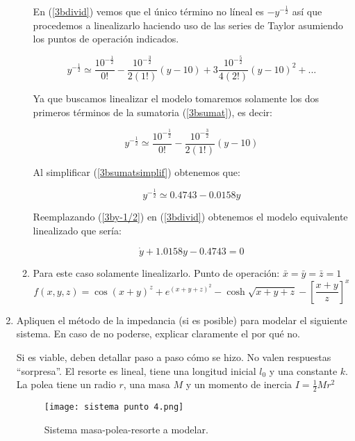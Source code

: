\documentclass[letterpaper, 12pt]{article}
\begin{document}
\begin{enumerate}
\begin{enumerate}
En (\ref{3bdivid}) vemos que el único término no líneal es $-y^{-\frac{1}{2}}$ así que procedemos a linealizarlo haciendo uso de las series de Taylor asumiendo los puntos de operación indicados.

\begin{equation}
    y^{-\frac{1}{2}}\simeq \frac{10^{-\frac{1}{2}}}{0!}-\frac{10^{-\frac{3}{2}}}{{2(1!)}}(y-10)+3\frac{10^{-\frac{5}{2}}}{{4(2!)}}(y-10)^2+...
    \label{3bsumat}
\end{equation}

Ya que buscamos linealizar el modelo tomaremos solamente los dos primeros términos de la sumatoria (\ref{3bsumat}), es decir:

\begin{equation}
    y^{-\frac{1}{2}}\simeq \frac{10^{-\frac{1}{2}}}{0!}-\frac{10^{-\frac{3}{2}}}{{2(1!)}}(y-10)
    \label{3bsumatsimplif}
\end{equation}

Al simplificar (\ref{3bsumatsimplif}) obtenemos que:

\begin{equation}
    y^{-\frac{1}{2}}\simeq 0.4743-0.0158y
    \label{3by-1/2}
\end{equation}

Reemplazando (\ref{3by-1/2}) en (\ref{3bdivid}) obtenemos el modelo equivalente linealizado que sería:


\begin{equation}
    \dot{y}+1.0158y-0.4743=0
\end{equation}

\item Para este caso solamente linealizarlo. Punto de operación: $ \bar{x} = \bar{y} = \bar{z} = 1$
\begin{equation}
    f(x,y,z)=\cos(x+y)^z+e^{(x+y+z)^2}-\cosh{\sqrt{x+y+z}-\left[\frac{x+y}{z}\right]^x}
\end{equation}






\end{enumerate}
\item Apliquen el método de la impedancia (si es posible) para modelar el siguiente sistema. En caso de no poderse, explicar claramente el por qué no.

Si es viable, deben detallar paso a paso cómo se hizo. No valen respuestas “sorpresa”. El resorte es lineal, tiene una longitud inicial $l_0$ y una constante $k$. La polea tiene un radio $r$, una masa $M$ y un momento de inercia $I = \frac{1}{2}Mr^2$
\begin{figure}[H]
    \centering
    \texttt{[image: sistema punto 4.png]}
    \caption{Sistema masa-polea-resorte a modelar.}
    \label{fig:sistema punto 4}
\end{figure}


\end{enumerate}
\end{document}
